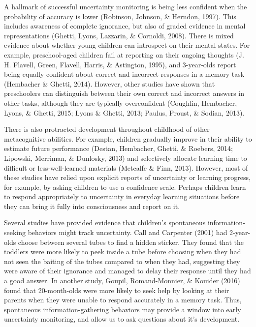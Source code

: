 \documentclass[10pt, letterpaper]{article}
\begin{document}
A hallmark of successful uncertainty monitoring is being less confident
when the probability of accuracy is lower (Robinson, Johnson, \&
Herndon, 1997). This includes awareness of complete ignorance, but also
of graded evidence in mental representations (Ghetti, Lyons, Lazzarin,
\& Cornoldi, 2008). There is mixed evidence about whether young children
can introspect on their mental states. For example, preschool-aged
children fail at reporting on their ongoing thoughts (J. H. Flavell,
Green, Flavell, Harris, \& Astington, 1995), and 3-year-olds report
being equally confident about correct and incorrect responses in a
memory task (Hembacher \& Ghetti, 2014). However, other studies have
shown that preschoolers can distinguish between their own correct and
incorrect answers in other tasks, although they are typically
overconfident (Coughlin, Hembacher, Lyons, \& Ghetti, 2015; Lyons \&
Ghetti, 2013; Paulus, Proust, \& Sodian, 2013).

There is also protracted development throughout childhood of other
metacognitive abilities. For example, children gradually improve in
their ability to estimate future performance (Destan, Hembacher, Ghetti,
\& Roebers, 2014; Lipowski, Merriman, \& Dunlosky, 2013) and selectively
allocate learning time to difficult or less-well-learned materials
(Metcalfe \& Finn, 2013). However, most of these studies have relied
upon explicit reports of uncertainty or learning progress, for example,
by asking children to use a confidence scale. Perhaps children learn to
respond appropriately to uncertainty in everyday learning situations
before they can bring it fully into consciousness and report on it.

Several studies have provided evidence that children's spontaneous
information-seeking behaviors might track uncertainty. Call and
Carpenter (2001) had 2-year-olds choose between several tubes to find a
hidden sticker. They found that the toddlers were more likely to peek
inside a tube before choosing when they had not seen the baiting of the
tubes compared to when they had, suggesting they were aware of their
ignorance and managed to delay their response until they had a good
answer. In another study, Goupil, Romand-Monnier, \& Kouider (2016)
found that 20-month-olds were more likely to seek help by looking at
their parents when they were unable to respond accurately in a memory
task. Thus, spontaneous information-gathering behaviors may provide a
window into early uncertainty monitoring, and allow us to ask questions
about it's development.
\end{document}
